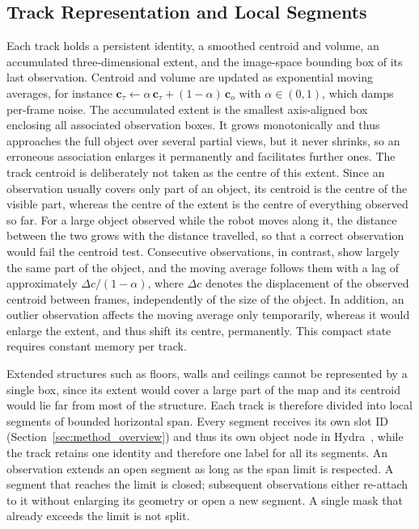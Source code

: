 \subsection{Track Representation and Local Segments}
\label{subsec:method_track_state}
{\small
Each track holds a persistent identity, a smoothed centroid and volume, an accumulated three-dimensional extent, and the image-space bounding box of its last observation. Centroid and volume are updated as exponential moving averages, for instance $\mathbf{c}_{\tau} \leftarrow \alpha\,\mathbf{c}_{\tau} + (1 - \alpha)\,\mathbf{c}_{o}$ with $\alpha \in (0, 1)$, which damps per-frame noise. The accumulated extent is the smallest axis-aligned box enclosing all associated observation boxes. It grows monotonically and thus approaches the full object over several partial views, but it never shrinks, so an erroneous association enlarges it permanently and facilitates further ones. The track centroid is deliberately not taken as the centre of this extent. Since an observation usually covers only part of an object, its centroid is the centre of the visible part, whereas the centre of the extent is the centre of everything observed so far. For a large object observed while the robot moves along it, the distance between the two grows with the distance travelled, so that a correct observation would fail the centroid test. Consecutive observations, in contrast, show largely the same part of the object, and the moving average follows them with a lag of approximately $\Delta c / (1 - \alpha)$, where $\Delta c$ denotes the displacement of the observed centroid between frames, independently of the size of the object. In addition, an outlier observation affects the moving average only temporarily, whereas it would enlarge the extent, and thus shift its centre, permanently. This compact state requires constant memory per track.

Extended structures such as floors, walls and ceilings cannot be represented by a single box, since its extent would cover a large part of the map and its centroid would lie far from most of the structure. Each track is therefore divided into local segments of bounded horizontal span. Every segment receives its own slot ID (Section~\ref{sec:method_overview}) and thus its own object node in Hydra~\cite{hughes2022hydra}, while the track retains one identity and therefore one label for all its segments. An observation extends an open segment as long as the span limit is respected. A segment that reaches the limit is closed; subsequent observations either re-attach to it without enlarging its geometry or open a new segment. A single mask that already exceeds the limit is not split.
\par}

